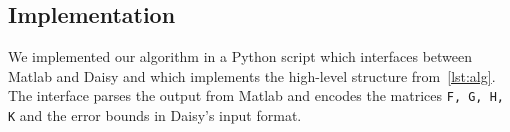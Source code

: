 

\subsection{Implementation}

We implemented our algorithm in a Python script which interfaces between Matlab
and Daisy and which implements the high-level structure from~\autoref{lst:alg}.
The interface parses the output from Matlab and encodes the matrices \texttt{F,
G, H, K} and the error bounds in Daisy's input format.

